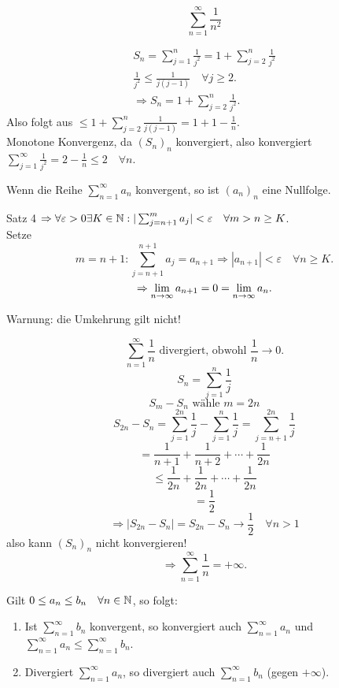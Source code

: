 \documentclass[../ana1.tex]{subfiles}
\begin{document}
\begin{bsp}
	\[ \sum_{n=1}^{\infty} \frac{1}{n^2} \]
\end{bsp}
\begin{bew}
	\begin{align*}
		S_n = \sum_{j=1}^{n}\frac{1}{j^2} = 1 + \sum_{j=2}^{n} \frac{1}{j^2}\\
		\frac{1}{j^2} \leq \frac{1}{j(j-1)} \quad \forall j\geq 2.\\
		\Rightarrow S_n = 1 + \sum_{j=2}^{n} \frac{1}{j^2}.
	\end{align*}
	Also folgt aus \( \leq 1 + \sum_{j=2}^{n} \frac{1}{j(j-1)} = 1 + 1 - \frac{1}{n} \).\\
	Monotone Konvergenz, da \({(S_n)}_n\) konvergiert, also konvergiert \(\sum_{j=1}^{\infty} \frac{1}{j^2} = 2 - \frac{1}{n} \leq 2 \quad\forall n \).
\end{bew}
\begin{kor}
	Wenn die Reihe \(\sum_{n=1}^{\infty} a_n\) konvergent, so ist \({(a_n)}_n\) eine Nullfolge.
\end{kor}
\begin{bew}
	Satz 4 \( \Rightarrow \forall \varepsilon >0 \exists K\in\mathbb{N}:|\sum_{j=n+1}^{m}a_j| < \varepsilon \quad \forall m>n\geq K \).\\
	Setze \[ m=n+1 : \sum_{j=n+1}^{n+1} a_j = a_{n+1} \Rightarrow |a_{n+1}|<\varepsilon \quad \forall n\geq K. \]
	\[ \Rightarrow \lim\limits_{n\rightarrow\infty}a_{n+1}=0=\lim\limits_{n\rightarrow\infty}a_n. \]
\end{bew}
\begin{bem}
	Warnung: die Umkehrung gilt nicht!
\end{bem}
\begin{bsp}
	\[ \sum_{n=1}^{\infty} \frac{1}{n} \text{ divergiert, obwohl } \frac{1}{n} \rightarrow 0. \]
	\[ S_n = \sum_{j=1}^{n}\frac{1}{j} \]
	\[ S_m -S_n \text{ wähle }m=2n \]
	\[ S_{2n} - S_n = \sum_{j=1}^{2n}\frac{1}{j} - \sum_{j=1}^{n}\frac{1}{j} = \sum_{j=n+1}^{2n}\frac{1}{j} \]
	\[ = \frac{1}{n+1} + \frac{1}{n+2} + \cdots + \frac{1}{2n} \]
	\[ \leq \frac{1}{2n} + \frac{1}{2n} + \cdots + \frac{1}{2n} \]
	\[ = \frac{1}{2} \]
	\[ \Rightarrow |S_{2n}-S_n| = S_{2n}-S_n \rightarrow \frac{1}{2} \quad\forall n>1 \]
	also kann \({(S_n)}_n\) nicht konvergieren!
	\[ \Rightarrow \sum_{n=1}^{\infty} \frac{1}{n} = +\infty. \]
\end{bsp}
\begin{satz}
	Gilt \(0\leq a_n \leq b_n \quad \forall n\in\mathbb{N} \), so folgt:
	\begin{enumerate}
		\item Ist \( \sum_{n=1}^{\infty}b_n \) konvergent, so konvergiert auch \( \sum_{n=1}^{\infty}a_n \) und \( \sum_{n=1}^{\infty} a_n \leq \sum_{n=1}^{\infty}b_n \).
		\item Divergiert \( \sum_{n=1}^{\infty}a_n \), so divergiert auch \( \sum_{n=1}^{\infty}b_n \) (gegen \(+\infty \)).
	\end{enumerate}
\end{satz}
\end{document}
